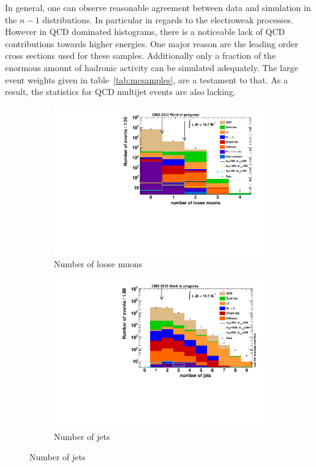 In general, one can observe reasonable agreement between data and simulation in the $n - 1$ distributions. In particular in regards to the electroweak processes. However in QCD dominated histograms, there is a noticeable lack of QCD contributions towards higher energies. One major reason are the leading order cross sections used for these samples. Additionally only a fraction of the enormous amount of hadronic activity can be simulated adequately. The large event weights given in table~\ref{tab:mcsamples}, are a testament to that. As a result, the statistics for QCD multijet events are also lacking.

\begin{figure}[b!]
  \centering
  \begin{subfigure}[b]{0.495\textwidth}
    \centering
    \includegraphics[width=\textwidth]{plots/nTL_nloose.pdf}
    \caption{Number of loose muons\label{fig:ntlnloose}}
  \end{subfigure}
  \begin{subfigure}[b]{0.495\textwidth}
    \centering
    \includegraphics[width=\textwidth]{plots/nTL_njets.pdf}
    \caption{Number of jets\label{fig:ntlnjets}}
  \end{subfigure}
\end{figure}

